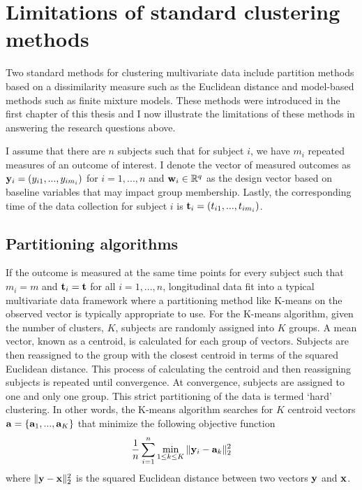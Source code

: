 \section{Limitations of standard clustering methods}
Two standard methods for clustering multivariate data include partition methods based on a dissimilarity measure such as the Euclidean distance and model-based methods such as finite mixture models. These methods were introduced in the first chapter of this thesis and I now illustrate the limitations of these methods in answering the research questions above. 

I assume that there are $n$ subjects such that for subject $i$, we have $m_{i}$ repeated measures of an outcome of interest. I denote the vector of measured outcomes as $\mathbf y_{i}=(y_{i1},...,y_{im_{i}})$ for $i=1,...,n$ and $\mathbf w_{i}\in \mathbb{R}^{q}$ as the design vector based on baseline variables that may impact group membership. Lastly, the corresponding time of the data collection for subject $i$ is $\mathbf t_{i}=(t_{i1},...,t_{im_{i}})$. 

\subsection{Partitioning algorithms}
If the outcome is measured at the same time points for every subject such that $m_{i}=m$ and $\mathbf t_{i}=\mathbf t$ for all $i=1,...,n$, longitudinal data fit into a typical multivariate data framework where a partitioning method like K-means \cite{macqueen1967, hartigan1979} on the observed vector is typically appropriate to use. For the K-means algorithm, given the number of clusters, $K$, subjects are randomly assigned into $K$ groups. A mean vector, known as a centroid, is calculated for each group of vectors. Subjects are then reassigned to the group with the closest centroid in terms of the squared Euclidean distance. This process of calculating the centroid and then reassigning subjects is repeated until convergence. At convergence, subjects are assigned to one and only one group. This strict partitioning of the data is termed `hard' clustering. In other words, the K-means algorithm searches for $K$ centroid vectors $\mathbf a=\{\mathbf a_{1}, ...,\mathbf a_{K}\}$ that minimize the following objective function
$$\frac{1}{n} \sum^{n}_{i=1}\min_{1\leq k\leq K}\|\mathbf  y_{i}-\mathbf a_{k}\|_{2}^{2}$$
where $\|\mathbf y - \mathbf x\|^{2}_{2}$ is the squared Euclidean distance between two vectors $\mathbf y$ and $\mathbf x$.

